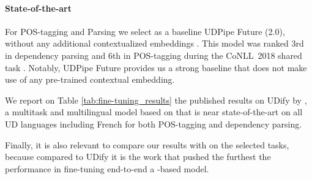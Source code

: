 \paragraph{State-of-the-art}

For POS-tagging and Parsing we select as a baseline UDPipe Future (2.0), without any additional contextualized embeddings \citep{straka-2018-udpipe}. This model was ranked 3rd in dependency parsing and 6th in POS-tagging during the CoNLL~2018 shared task \citep{seker-etal-2018-universal}. Notably, UDPipe Future provides us a strong baseline that does not make use of any pre-trained contextual embedding.

We report on Table \ref{tab:fine-tuning_results} the published results on UDify by \cite{kondratyuk-straka-2019-75}, a multitask and multilingual model based on \mbert that is near state-of-the-art on all UD languages including French for both POS-tagging and dependency parsing.



Finally, it is also relevant to compare our results with \camembert on the selected tasks, because compared to UDify it is the work that pushed the furthest the performance in fine-tuning end-to-end a \bert-based model.



